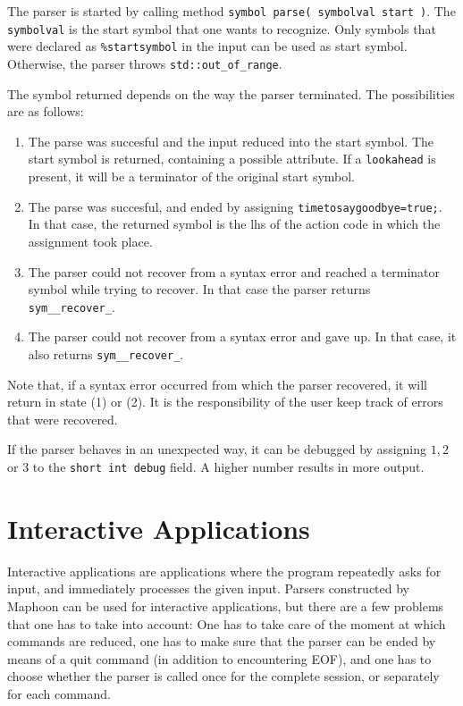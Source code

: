 \documentclass{article}
\begin{document}
The parser is started by calling method
\verb+symbol parse( symbolval start )+.
The \verb+symbolval+ is the start symbol that one wants to recognize.
Only symbols that were declared as \verb+%startsymbol+ in the input
can be used as start symbol. Otherwise, the parser 
throws \verb+std::out_of_range+. 

The symbol returned depends on the way the parser
terminated. The possibilities are as follows: 
\begin{enumerate}
\item
   The parse was succesful and the input reduced into the start symbol. 
   The start symbol is returned, containing a possible attribute. 
   If a \verb+lookahead+ is present, it will be a terminator
   of the original start symbol. 
\item
   The parse was succesful, and ended by assigning
   \verb+timetosaygoodbye=true;+.
   In that case, the returned symbol is the lhs of the 
   action code in which the assignment took place.  
\item
   The parser could not recover from a syntax error and reached
   a terminator symbol while trying to recover. In that
   case the parser returns \verb+sym__recover_+. 
\item
   The parser could not recover from a syntax error and gave up.
   In that case, it also returns \verb+sym__recover_+. 
\end{enumerate}

\noindent
Note that, if a syntax error occurred from which the parser 
recovered, it will return in state (1) or (2). It is the responsibility
of the user keep track of errors that were recovered. 

If the parser behaves in an unexpected way, it can be
debugged by assigning $ 1,2 $ or $ 3 $ to the \verb+short int debug+ field. 
A higher number results in more output. 

\section{Interactive Applications}
\label{Sect_interactive}

Interactive applications are applications where the
program repeatedly asks for input, and immediately processes the 
given input.
Parsers constructed by Maphoon can be used
for interactive applications,
but there are a few problems that one has to take into account: 
One has to take care of the moment at which commands are reduced, 
one has to make sure that the parser can be ended by means of a
quit command (in addition to encountering EOF), and one 
has to choose whether the parser is called once for the complete 
session, or separately for each command. 
\end{document}
